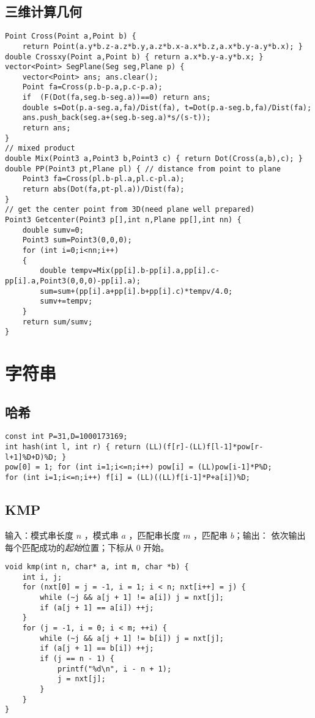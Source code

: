 \documentclass[landscape,a4paper]{article}
\begin{document}
\subsection{三维计算几何}
\begin{lstlisting}
Point Cross(Point a,Point b) {
	return Point(a.y*b.z-a.z*b.y,a.z*b.x-a.x*b.z,a.x*b.y-a.y*b.x); }
double Crossxy(Point a,Point b) { return a.x*b.y-a.y*b.x; }
vector<Point> SegPlane(Seg seg,Plane p) {
	vector<Point> ans; ans.clear();
	Point fa=Cross(p.b-p.a,p.c-p.a);
	if  (F(Dot(fa,seg.b-seg.a))==0) return ans;
	double s=Dot(p.a-seg.a,fa)/Dist(fa), t=Dot(p.a-seg.b,fa)/Dist(fa);
	ans.push_back(seg.a+(seg.b-seg.a)*s/(s-t));
	return ans;
}
// mixed product
double Mix(Point3 a,Point3 b,Point3 c) { return Dot(Cross(a,b),c); }
double PP(Point3 pt,Plane pl) { // distance from point to plane
	Point3 fa=Cross(pl.b-pl.a,pl.c-pl.a);
	return abs(Dot(fa,pt-pl.a))/Dist(fa);
}
// get the center point from 3D(need plane well prepared)
Point3 Getcenter(Point3 p[],int n,Plane pp[],int nn) {
	double sumv=0;
	Point3 sum=Point3(0,0,0);
	for (int i=0;i<nn;i++)
	{
		double tempv=Mix(pp[i].b-pp[i].a,pp[i].c-pp[i].a,Point3(0,0,0)-pp[i].a);
		sum=sum+(pp[i].a+pp[i].b+pp[i].c)*tempv/4.0;
		sumv+=tempv;
	}
	return sum/sumv;
}
\end{lstlisting}


\section{字符串}
\subsection{哈希}
\begin{lstlisting}
const int P=31,D=1000173169;
int hash(int l, int r) { return (LL)(f[r]-(LL)f[l-1]*pow[r-l+1]%D+D)%D; }
pow[0] = 1;	for (int i=1;i<=n;i++) pow[i] = (LL)pow[i-1]*P%D;
for (int i=1;i<=n;i++) f[i] = (LL)((LL)f[i-1]*P+a[i])%D;
\end{lstlisting}
\subsection{KMP}
输入：模式串长度 $n$ ，模式串 $a$ ，匹配串长度 $m$ ，匹配串 $b$；输出： 依次输出每个匹配成功的\emph{起始}位置；下标从 $0$ 开始。

\begin{lstlisting}
void kmp(int n, char* a, int m, char *b) {
    int i, j;
    for (nxt[0] = j = -1, i = 1; i < n; nxt[i++] = j) {
        while (~j && a[j + 1] != a[i]) j = nxt[j];
        if (a[j + 1] == a[i]) ++j;
    }
    for (j = -1, i = 0; i < m; ++i) {
        while (~j && a[j + 1] != b[i]) j = nxt[j];
        if (a[j + 1] == b[i]) ++j;
        if (j == n - 1) {
            printf("%d\n", i - n + 1);
            j = nxt[j];
        }
    }
}
\end{lstlisting}
\end{document}
